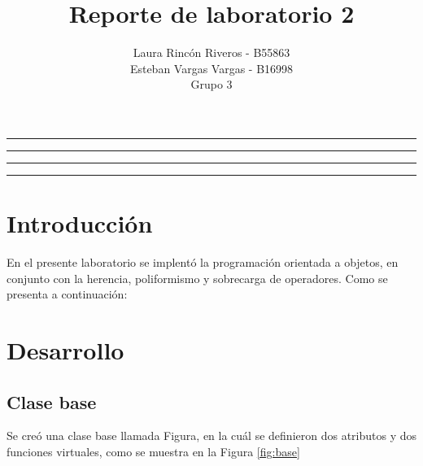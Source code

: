 \documentclass[11pt]{article}
\title{Reporte de laboratorio 2}
\author{Laura Rincón Riveros - B55863\\Esteban Vargas Vargas - B16998\\ Grupo 3}
\begin{document}
\maketitle
\hrule
\hrule
\tableofcontents
\hspace{5mm}
\hrule
\hrule

\section{Introducción}

En el presente laboratorio se implentó la programación orientada a objetos, en conjunto con la herencia, poliformismo y sobrecarga de operadores. Como se presenta a continuación:


\newpage
\section{Desarrollo}

\subsection{Clase base}

Se creó una clase base llamada Figura, en la cuál se definieron dos atributos y dos funciones virtuales, como se muestra en la Figura \ref{fig:base}
\end{document}

